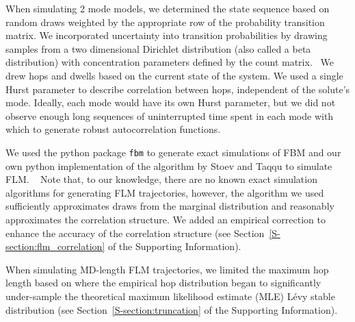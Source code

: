 \documentclass{article}
\begin{document}
  When simulating 2 mode models, we determined the state sequence based on random 
  draws weighted by the appropriate row of the probability transition matrix. We 
  incorporated uncertainty into transition probabilities by drawing samples from a 
  two dimensional Dirichlet distribution (also called a beta distribution) with concentration parameters defined by 
  the count matrix.~\cite{bacallado_bayesian_2009} We drew hops and dwells based on
  the current state of the system. We used a single Hurst parameter to describe
  correlation between hops, independent of the solute's mode. Ideally, each mode
  would have its own Hurst parameter, but we did not observe enough long sequences
  of uninterrupted time spent in each mode with which to generate robust
  autocorrelation functions. 
  
  We used the python package \texttt{fbm} to generate exact simulations of FBM and our
  own python implementation of the algorithm by Stoev and Taqqu to simulate FLM.
  ~\cite{stoev_simulation_2004} Note that, to our knowledge, there are no known exact
  simulation algorithms for generating FLM trajectories, however, the algorithm
  we used sufficiently approximates draws from the marginal distribution and reasonably 
  approximates the correlation structure. We added an empirical correction to enhance
  the accuracy of the correlation structure (see Section~\ref{S-section:flm_correlation}
  of the Supporting Information).
  


  When simulating MD-length FLM trajectories, we limited the maximum hop length based on where
  the empirical hop distribution began to significantly under-sample the theoretical
  maximum likelihood estimate (MLE) L\'evy stable distribution (see 
  Section~\ref{S-section:truncation} of the Supporting Information).
\end{document}
